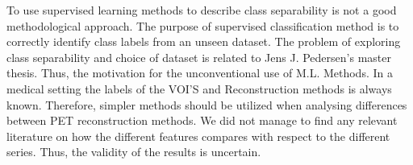 
To use supervised learning methods to describe class separability is not a
good methodological approach. The purpose of supervised classification
method is to correctly identify class labels from an unseen dataset.     
The problem of exploring class separability and choice of dataset is
related to Jens J. Pedersen's master thesis. Thus, the motivation for the 
unconventional use of M.L. Methods. In a medical setting the labels of the
VOI'S and Reconstruction methods is always known. Therefore, simpler methods
should be utilized when analysing differences between PET reconstruction
methods. We did not manage to find any relevant literature on how the different features compares
with respect to the different series. Thus, the validity of the results is
uncertain. 
 




% 
